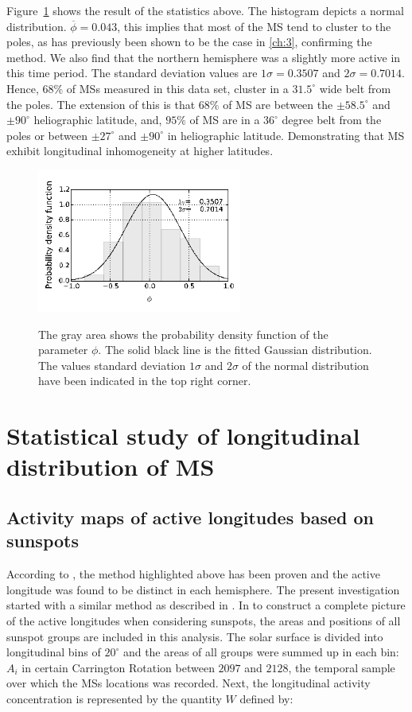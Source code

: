 Figure~\ref{ms_dis} shows the result of the statistics above. 
The histogram depicts a normal distribution. 
$\overline{\phi}=0.043$, this implies that most of the MS tend to cluster to the poles, as has previously been shown to be the case in \ref{ch:3}, confirming the method.
We also find that the northern hemisphere was a slightly more active in this time period.
The standard deviation values are $1\sigma=0.3507$ and $2\sigma=0.7014$. 
Hence, $68\%$ of MSs measured in this data set, cluster in a $31.5^{\circ}$ wide belt from the poles.
The extension of this is that $68\%$ of MS are between the $\pm58.5^{\circ}$ and $\pm90^{\circ}$ heliographic latitude, and, $95\%$ of MS are in a $36^{\circ}$ degree belt from the poles or between $\pm27^{\circ}$ and $\pm90^{\circ}$ in heliographic latitude.
Demonstrating that MS exhibit longitudinal inhomogeneity at higher latitudes.

\begin{figure}
	\centering
	{\includegraphics[width=0.6\textwidth]{Chapter4/Figs/MS_latitude_distribution}}
	{\caption{ The gray area shows the probability density function of the parameter $\phi$. The solid black line is the fitted Gaussian distribution. The values standard deviation $1\sigma$ and $2\sigma$ of the normal distribution have been indicated in the top right corner.}\label{ms_dis}}
\end{figure}

\section{Statistical study of longitudinal distribution of MS}
\subsection{Activity maps of active longitudes based on sunspots}

According to \cite{Gyenge2014}, the method highlighted above has been proven and the active longitude was found to be distinct in each hemisphere.
The present investigation started with a similar method as described in \cite{Gyenge2012}. 
In to construct a complete picture of the active longitudes when considering sunspots, the areas and positions of all sunspot groups are included in this analysis.
The solar surface is divided into longitudinal bins of $20^{\circ}$ and the areas of all groups were summed up in each bin: $ A_{i}$ in certain Carrington Rotation between $2097$ and $2128$, the temporal sample over which the MSs locations was recorded.
Next, the longitudinal activity concentration is represented by the quantity $W$ defined by:

